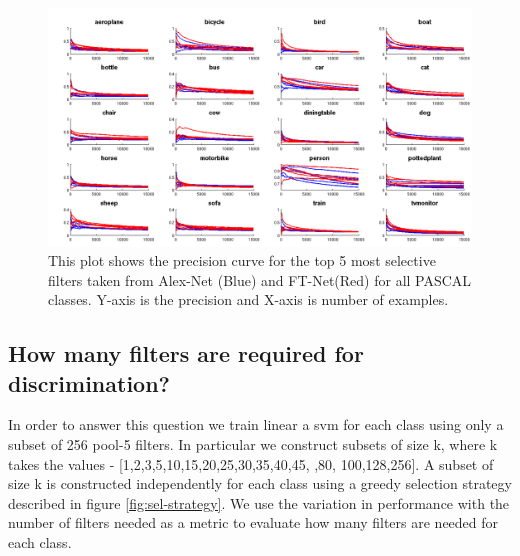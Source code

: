 \begin{figure}[t!]
\centering
\includegraphics[scale=0.20]{images/prob_sel_dims_top5.png}
\caption{This plot shows the precision curve for the top 5 most selective filters taken from Alex-Net (Blue) and FT-Net(Red) for all PASCAL classes. Y-axis is the precision and X-axis is number of examples.}
\label{fig:prob-sel}
\end{figure}

\subsection{How many filters are required for discrimination?}
\label{sub:how-many}
In order to answer this question we train linear a svm for each class using only a subset of 256 pool-5 filters. In particular we construct subsets of size k, where k takes the values - [1,2,3,5,10,15,20,25,30,35,40,45, ,80, 100,128,256]. A subset of size k is constructed independently for each class using a greedy selection strategy described in figure \ref{fig:sel-strategy}. We use the variation in performance with the number of filters needed as a metric to evaluate how many filters are needed for each class. 
  
